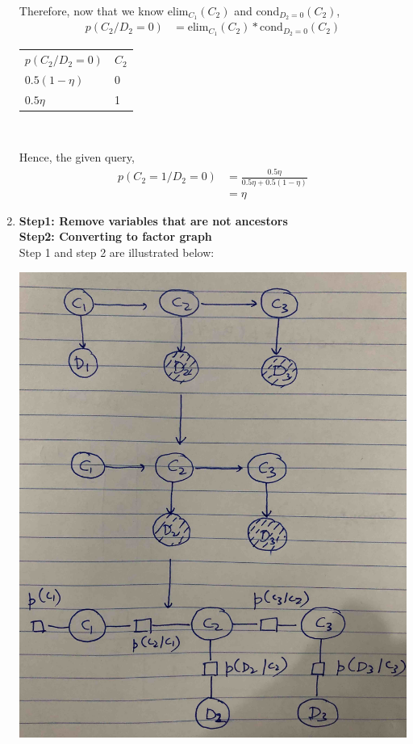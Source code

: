 \documentclass[12pt]{article}
\begin{document}
\begin{enumerate}[label=(\alph*)]
\begin{center}
\begin{tabular}{ll}
  \end{tabular} \newline \\
  \end{center}
  Therefore, now that we know elim$_{C_1}(C_2)$ and cond$_{D_2 = 0} (C_2)$,
  \begin{align*}
  p(C_2/ D_2 = 0) &= \text{elim}_{C_1}(C_2) * \text{cond}_{D_2 = 0} (C_2)
  \end{align*}
  \begin{center}
  \begin{tabular}{ll}
  $p(C_2/ D_2 = 0)$ & $C_2$  \\
  $0.5 (1-\eta)$            & 0       \\
  $0.5 \eta$               & 1       \\
  \end{tabular} \newline \\
  \end{center}
  Hence, the given query,
  \begin{align*}
  p(C_2 = 1/ D_2 = 0) &= \frac{0.5 \eta}{0.5 \eta + 0.5 (1-\eta)} \\
  &= \eta
  \end{align*}
  \item 
  \textbf{Step1: Remove variables that are not ancestors} \\
  \textbf{Step2: Converting to factor graph} \\
  Step 1 and step 2 are illustrated below:
  \begin{center}
  \includegraphics[scale=0.1]{IMG_2279.jpg}

\end{center}
\end{enumerate}
\end{document}
